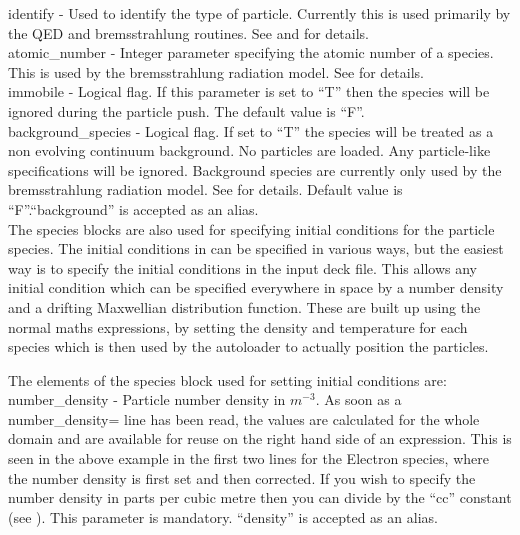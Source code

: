 {\emphtext identify} - Used to identify the type of particle. Currently this
is used primarily by the QED and bremsstrahlung routines. See 
and  for details.\\

{\emphtext atomic\_number} - Integer parameter specifying the atomic number of
a species. This is used by the bremsstrahlung radiation model. See
 for details.\\

{\emphtext immobile} - Logical flag. If this parameter is set to ``T'' then
the species will be ignored during the particle push. The default value
is ``F''.\\

{\emphtext background\_species} - Logical flag. If set to ``T'' the species will
be treated as a non evolving continuum background. No particles are loaded. Any
particle-like specifications will be ignored. Background species are currently
only used by the bremsstrahlung radiation model. See 
for details. Default value is ``F''.``background'' is accepted as an alias.\\

The species blocks are also used for specifying initial conditions for
the particle species. The initial conditions in {\EPOCH} can be specified in
various ways, but the easiest way is to specify the initial conditions in the
input deck file. This allows any initial condition which can be specified
everywhere in space by a number density and a drifting Maxwellian distribution
function.
These are built up using the normal maths
expressions, by setting the density and temperature for each species which is
then used by the autoloader to actually position the particles.

The elements of the species block used for setting
initial conditions are:\\

{\emphtext number\_density} - Particle number density in $m^{-3}$.
As soon as a number\_density= line has been read, the values are
calculated for the whole domain and are available for reuse on the right hand
side of an expression. This is seen in the above example in the first two lines
for the Electron species, where the number density is first set and then
corrected.  If you wish to specify the number density in parts per cubic metre
then you can divide by the ``cc'' constant (see ).
This parameter is mandatory. ``density'' is accepted as an alias.\\

